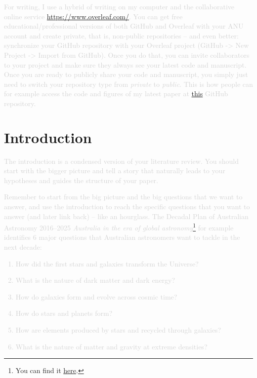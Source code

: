 \documentclass[twocolumn,apj,numberedappendix,appendixfloats]{openjournal}
\newcommand{\comment}[1]{\textcolor{lightgray}{#1}}
\begin{document}
\comment{For writing, I use a hybrid of writing on my computer and the collaborative online service \url{https://www.overleaf.com/}. You can get free educational/professional versions of both GitHub and Overleaf with your ANU account and create private, that is, non-public repositories -- and even better: synchronize your GitHub repository with your Overleaf project (GitHub -> New Project -> Import from GitHub). Once you do that, you can invite collaborators to your project and make sure they always see your latest code and manuscript. Once you are ready to publicly share your code and manuscript, you simply just need to switch your repository type from \textit{private} to \textit{public}. This is how people can for example access the code and figures of my latest paper \citep{Buder2024} at \href{https://github.com/svenbuder/Accretion_Clues_ObsSim}{this} GitHub repository.}

\clearpage
\section{Introduction}
\label{sec:introduction}

\comment{The introduction is a condensed version of your literature review. You should start with the bigger picture and tell a story that naturally leads to your hypotheses and guides the structure of your paper.}

\comment{Remember to start from the big picture and the big questions that we want to answer, and use the introduction to reach the specific questions that you want to answer (and later link back) -- like an hourglass. The Decadal Plan of Australian Astronomy 2016--2025 \textit{Australia in the era of global astronomy}\footnote{You can find it \href{https://www.science.org.au/supporting-science/science-sector-analysis/reports-and-publications/decadal-plan-australian-astronomy-2016-25}{here}.} for example identifies 6 major questions that Australian astronomers want to tackle in the next decade: 
\begin{enumerate}
    \item How did the first stars and galaxies transform the Universe?
    \item What is the nature of dark matter and dark energy?
    \item How do galaxies form and evolve across cosmic time?
    \item How do stars and planets form?
    \item How are elements produced by stars and recycled through galaxies?
    \item What is the nature of matter and gravity at extreme densities?
\end{enumerate}}
\end{document}
